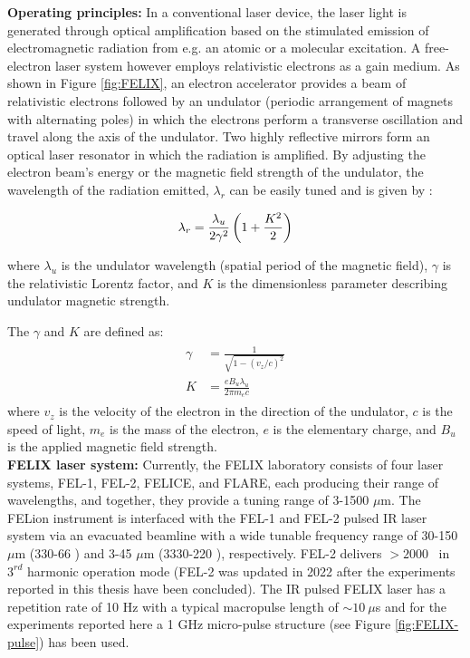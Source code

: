 \textbf{Operating principles:} In a conventional laser device, the laser light is generated through optical amplification based on the stimulated emission of electromagnetic radiation from e.g. an atomic or a molecular excitation. A free-electron laser system however employs relativistic electrons as a gain medium. As shown in Figure \ref{fig:FELIX}, an electron accelerator provides a beam of relativistic electrons followed by an undulator (periodic arrangement of magnets with alternating poles) in which the electrons perform a transverse oscillation and travel along the axis of the undulator. Two highly reflective mirrors form an optical laser resonator in which the radiation is amplified. By adjusting the electron beam's energy or the magnetic field strength of the undulator, the wavelength of the radiation emitted, $\lambda_r$ can be easily tuned and is given by \cite{oepts_free-electron-laser_1995}:

\[\lambda_r = \frac{\lambda_u}{2\gamma^2} \left( 1 + \frac{K^2}{2} \right)\]

where $\lambda_u$ is the undulator wavelength (spatial period of the magnetic field), $\gamma$ is the relativistic Lorentz factor, and $K$ is the dimensionless parameter describing undulator magnetic strength.

The $\gamma$ and $K$ are defined as:
\begin{align*}
    \begin{split}
        \gamma &= \frac{1}{\sqrt{1-(v_z/c)^2}}\\
        K &= \frac{eB_u\lambda_u}{2\pi m_e c}
    \end{split}
\end{align*}
where $v_z$ is the velocity of the electron in the direction of the undulator, $c$ is the speed of light, $m_e$ is the mass of the electron, $e$ is the elementary charge, and $B_u$ is the applied magnetic field strength.\\

\textbf{FELIX laser system:} Currently, the FELIX laboratory consists of four laser systems, FEL-1, FEL-2, FELICE, and FLARE, each producing their range of wavelengths, and together, they provide a tuning range of 3-1500 $\mu$m. The FELion instrument is interfaced with the FEL-1 and FEL-2 pulsed IR laser system via an evacuated beamline with a wide tunable frequency range of 30-150 $\mu$m (330-66 \wn) and 3-45 $\mu$m (3330-220 \wn), respectively. FEL-2 delivers $> 2000$ \wn\ in $3^{rd}$ harmonic operation mode (FEL-2 was updated in 2022 after the experiments reported in this thesis have been concluded). The IR pulsed FELIX laser has a repetition rate of 10 Hz with a typical macropulse length of $\sim  10\ \mu$s and for the experiments reported here a 1 GHz micro-pulse structure (see Figure \ref{fig:FELIX-pulse}) has been used. 

